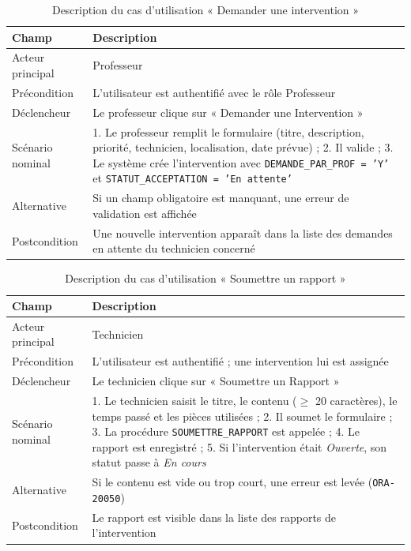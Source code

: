 \documentclass[12pt,a4paper,oneside]{report}
\begin{document}
\begin{table}[H]
  \centering
  \caption{Description du cas d'utilisation « Demander une intervention »}
  \begin{tabularx}{\linewidth}{@{}l X@{}}
    \toprule
    \textbf{Champ} & \textbf{Description} \\
    \midrule
    Acteur principal & Professeur \\
    Précondition & L'utilisateur est authentifié avec le rôle Professeur \\
    Déclencheur & Le professeur clique sur « Demander une Intervention » \\
    Scénario nominal & 1. Le professeur remplit le formulaire (titre, description, priorité, technicien, localisation, date prévue) ; 2. Il valide ; 3. Le système crée l'intervention avec \texttt{DEMANDE\_PAR\_PROF = 'Y'} et \texttt{STATUT\_ACCEPTATION = 'En attente'} \\
    Alternative & Si un champ obligatoire est manquant, une erreur de validation est affichée \\
    Postcondition & Une nouvelle intervention apparaît dans la liste des demandes en attente du technicien concerné \\
    \bottomrule
  \end{tabularx}
  \label{tab:uc-demander}
\end{table}

\begin{table}[H]
  \centering
  \caption{Description du cas d'utilisation « Soumettre un rapport »}
  \begin{tabularx}{\linewidth}{@{}l X@{}}
    \toprule
    \textbf{Champ} & \textbf{Description} \\
    \midrule
    Acteur principal & Technicien \\
    Précondition & L'utilisateur est authentifié ; une intervention lui est assignée \\
    Déclencheur & Le technicien clique sur « Soumettre un Rapport » \\
    Scénario nominal & 1. Le technicien saisit le titre, le contenu ($\geq$ 20 caractères), le temps passé et les pièces utilisées ; 2. Il soumet le formulaire ; 3. La procédure \texttt{SOUMETTRE\_RAPPORT} est appelée ; 4. Le rapport est enregistré ; 5. Si l'intervention était \textit{Ouverte}, son statut passe à \textit{En cours} \\
    Alternative & Si le contenu est vide ou trop court, une erreur est levée (\texttt{ORA-20050}) \\
    Postcondition & Le rapport est visible dans la liste des rapports de l'intervention \\
    \bottomrule
  \end{tabularx}
  \label{tab:uc-rapport}
\end{table}
\end{document}
